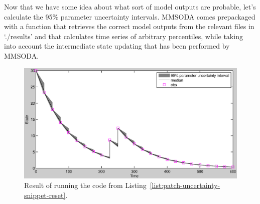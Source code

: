 Now that we have some idea about what sort of model outputs are probable, let's calculate the 95\% parameter uncertainty intervals. MMSODA comes prepackaged with a function that retrieves the correct model outputs from the relevant files in `./results' and that calculates time series of arbitrary percentiles, while taking into account the intermediate state updating that has been performed by MMSODA.






\begin{figure}[htb]
  \centering
    \includegraphics[width=\linewidth,keepaspectratio]{./../eps/result-of-patch-uncertainty-snippet-reset.eps}
  \caption{Result of running the code from Listing~\ref{list:patch-uncertainty-snippet-reset}.}
  \label{fig:result-of-patch-uncertainty-snippet-reset}
\end{figure}



